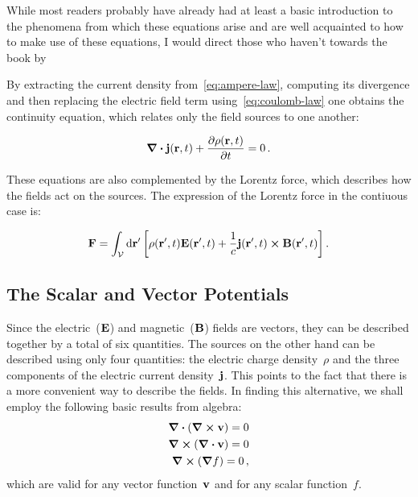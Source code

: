 \documentclass[12pt, class=report, crop=false]{standalone}
\begin{document}
\par
While most readers probably have already had at least a basic introduction to the phenomena from which these equations arise and are well acquainted to how to make use of these equations, I would direct those who haven't towards the book by~\cite{fleischStudentGuideMaxwell2008}%

\par
By extracting the current density from~\cref{eq:ampere-law}, computing its divergence and then replacing the electric field term using~\cref{eq:coulomb-law} one obtains the continuity equation, which relates only the field sources to one another:

\begin{equation}
  \label{eq:continuity-equation}
  \div{\vb{j}(\vb{r}, t)} + \pdv{\rho(\vb{r}, t)}{t} = 0 \,.
\end{equation}

\par
These equations are also complemented by the Lorentz force, which describes how the fields act on the sources. The expression of the Lorentz force in the contiuous case is:

\[
  \vb{F} = \int_\mathcal{V} \dd{\vb{r}'} \left[ \rho(\vb{r}', t) \vb{E}(\vb{r}', t) +
           \frac{1}{c} \vb{j}(\vb{r}', t) \cross \vb{B}(\vb{r}', t)\right] .
\]

\subsection{The Scalar and Vector Potentials}

Since the electric~(\(\vb{E}\)) and magnetic~(\(\vb{B}\)) fields are vectors, they can be described together by a total of six quantities. The sources on the other hand can be described using only four quantities: the electric charge density~\(\rho\) and the three components of the electric current density~\(\vb{j}\). This points to the fact that there is a more convenient way to describe the fields. In finding this alternative, we shall employ the following basic results from algebra:
\begin{subequations}
  \label{id:algebra}
  \begin{align}
    \div{(\curl{\vb{v}})}=0
    \label{id:div-rot} \\
    \curl{(\div{\vb{v}})}=0
    \label{id:rot-div} \\
    \curl{(\grad{f})}=0
    \label{id:rot-grad} \,,
  \end{align}
\end{subequations}
which are valid for any vector function~\(\vb{v}\) and for any scalar function~\(f\).
\end{document}
